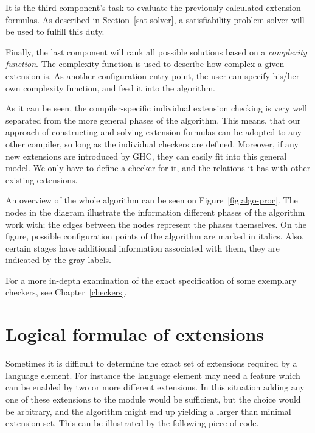 \documentclass[main.tex]{subfiles}
\begin{document}
	It is the third component's task to evaluate the previously calculated extension formulas. As described in Section~\ref{sat-solver}, a satisfiability problem solver will be used to fulfill this duty.
	
	Finally, the last component will rank all possible solutions based on a \emph{complexity function}. The complexity function is used to describe how complex a given extension is. As another configuration entry point, the user can specify his/her own complexity function, and feed it into the algorithm.
	
	As it can be seen, the compiler-specific individual extension checking is very well separated from the more general phases of the algorithm. This means, that our approach of constructing and solving extension formulas can be adopted to any other compiler, so long as the individual checkers are defined. Moreover, if any new extensions are introduced by GHC, they can easily fit into this general model. We only have to define a checker for it, and the relations it has with other existing extensions.
	
	An overview of the whole algorithm can be seen on Figure~\ref{fig:algo-proc}. The nodes in the diagram illustrate the information different phases of the algorithm work with; the edges between the nodes represent the phases themselves. On the figure, possible configuration points of the algorithm are marked in italics. Also, certain stages have additional information associated with them, they are indicated by the gray labels.
	
	For a more in-depth examination of the exact specification of some exemplary checkers, see Chapter~\ref{checkers}.
	
	
	\begin{figure}[t] 
		\centering
		
	\end{figure}
	

	\section{Logical formulae of extensions} \label{extension-formulas}
	
	Sometimes it is difficult to determine the exact set of extensions required by a language element. For instance the language element may need a feature which can be enabled by two or more different extensions. In this situation adding any one of these extensions to the module would be sufficient, but the choice would be arbitrary, and the algorithm might end up yielding a larger than minimal extension set. This can be illustrated by the following piece of code. 
	
\end{document}
